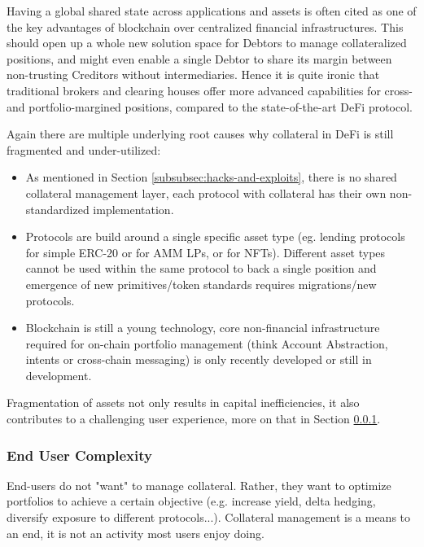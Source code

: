 \documentclass[sigconf,nonacm]{acmart}
\begin{document}
Having a global shared state across applications and assets is often cited as one of the key advantages of blockchain over centralized financial infrastructures\cite{schar2021decentralized}.
This should open up a whole new solution space for Debtors to manage collateralized positions,
and might even enable a single Debtor to share its margin between non-trusting Creditors without intermediaries.
Hence it is quite ironic that traditional brokers and clearing houses offer more advanced capabilities for cross- and portfolio-margined positions,
compared to the state-of-the-art DeFi protocol.

Again there are multiple underlying root causes why collateral in DeFi is still fragmented and under-utilized:
\begin{itemize}
    \item As mentioned in Section \ref{subsubsec:hacks-and-exploits},
    there is no shared collateral management layer, each protocol with collateral has their own non-standardized implementation.
    \item Protocols are build around a single specific asset type (eg. lending protocols for simple ERC-20 or for AMM LPs, or for NFTs). 
    Different asset types cannot be used within the same protocol to back a single position and emergence of new primitives/token standards requires migrations/new protocols.
    \item Blockchain is still a young technology, core non-financial infrastructure required for on-chain portfolio management
    (think Account Abstraction, intents or cross-chain messaging) is only recently developed or still in development. 
\end{itemize}

Fragmentation of assets not only results in capital inefficiencies, it also contributes to a challenging user experience, more on that in Section \ref{subsubsec:end-user-complexity}.

\subsubsection{End User Complexity}
\label{subsubsec:end-user-complexity}

End-users do not "want" to manage collateral.
Rather, they want to optimize portfolios to achieve a certain objective (e.g. increase yield, delta hedging, diversify exposure to different protocols...).
Collateral management is a means to an end, it is not an activity most users enjoy doing.
\end{document}
